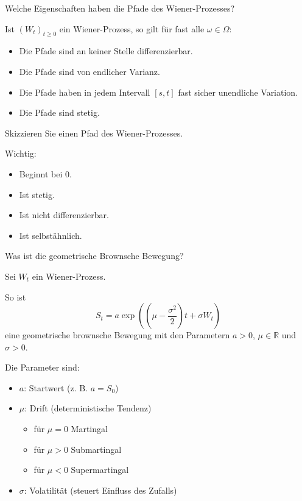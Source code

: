 \begin{QandA}
    \item Welche Eigenschaften haben die Pfade des Wiener-Prozesses?
    \begin{answered}
        Ist $(W_t)_{t \geq 0}$ ein Wiener-Prozess, so gilt für fast alle $\omega \in \Omega$:
        \begin{itemize}
            \item Die Pfade sind an keiner Stelle differenzierbar.
            \item Die Pfade sind von endlicher Varianz.
            \item Die Pfade haben in jedem Intervall $[s, t]$ fast sicher unendliche Variation.
            \item Die Pfade sind stetig.
        \end{itemize}
    \end{answered}

    \item Skizzieren Sie einen Pfad des Wiener-Prozesses.
    \begin{answered}
        Wichtig:
        \begin{itemize}
            \item Beginnt bei $0$.
            \item Ist stetig.
            \item Ist nicht differenzierbar.
            \item Ist selbstähnlich.
        \end{itemize}
    \end{answered}

    \item Was ist die geometrische Brownsche Bewegung?
    \begin{answered}
        Sei $W_{t}$ ein Wiener-Prozess.

        So ist
        \[
            S_t = a \exp\left(\left(\mu - \frac{\sigma^2}{2}\right)t + \sigma W_t\right)
        \]
        eine geometrische brownsche Bewegung mit den Parametern $a > 0$, $\mu \in \mathbb{R}$ und $\sigma > 0$.

        Die Parameter sind:
        \begin{itemize}
            \item $a$: Startwert (z. B. $a = S_0$)
            \item $\mu$: Drift (deterministische Tendenz)
                  \begin{itemize}
                      \item für $\mu = 0$ Martingal
                      \item für $\mu > 0$ Submartingal
                      \item für $\mu < 0$ Supermartingal
                  \end{itemize}
            \item $\sigma$: Volatilität (steuert Einfluss des Zufalls)
        \end{itemize}
    \end{answered}


\end{QandA}

